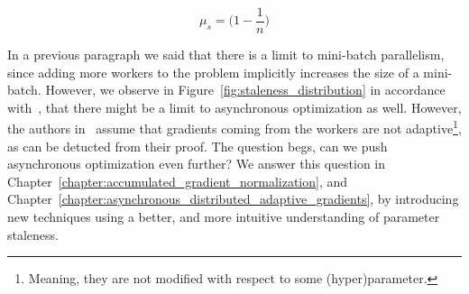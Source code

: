 \begin{equation}
  \label{eq:implicit_momentum}
  \mu_s = \Bigg(1 - \frac{1}{n}\Bigg)
\end{equation}

In a previous paragraph we said that there is a limit to mini-batch parallelism, since adding more workers to the problem implicitly increases the size of a mini-batch. However, we observe in Figure~\ref{fig:staleness_distribution} in accordance with~\cite{implicitmomentum}, that there might be a limit to asynchronous optimization as well. However, the authors in~\cite{implicitmomentum} assume that gradients coming from the workers are not adaptive\footnote{Meaning, they are not modified with respect to some (hyper)parameter.}, as can be detucted from their proof. The question begs, can we push asynchronous optimization even further? We answer this question in Chapter~\ref{chapter:accumulated_gradient_normalization}, and Chapter~\ref{chapter:asynchronous_distributed_adaptive_gradients}, by introducing new techniques using a better, and more intuitive understanding of parameter staleness.

